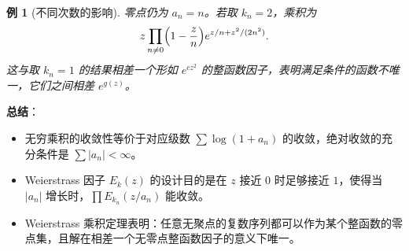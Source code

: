 \documentclass[UTF8]{ctexart}
\newtheorem{example}{例}[section]
\numberwithin{equation}{section}
\begin{document}
\begin{example}[不同次数的影响]
零点仍为 \(a_n = n\)。若取 \(k_n = 2\)，乘积为
\[
z \prod_{n \neq 0} \Bigl( 1 - \frac{z}{n} \Bigr) e^{z/n + z^2/(2n^2)}.
\]
这与取 \(k_n = 1\) 的结果相差一个形如 \(e^{c z^2}\) 的整函数因子，表明满足条件的函数不唯一，它们之间相差 \(e^{g(z)}\)。
\end{example}

\textbf{总结}：
\begin{itemize}
\item 无穷乘积的收敛性等价于对应级数 \(\sum \log(1+a_n)\) 的收敛，绝对收敛的充分条件是 \(\sum |a_n| < \infty\)。
\item Weierstrass 因子 \(E_k(z)\) 的设计目的是在 \(z\) 接近 \(0\) 时足够接近 \(1\)，使得当 \(|a_n|\) 增长时，\(\prod E_{k_n}(z/a_n)\) 能收敛。
\item Weierstrass 乘积定理表明：任意无聚点的复数序列都可以作为某个整函数的零点集，且解在相差一个无零点整函数因子的意义下唯一。
\end{itemize}
\end{document}
